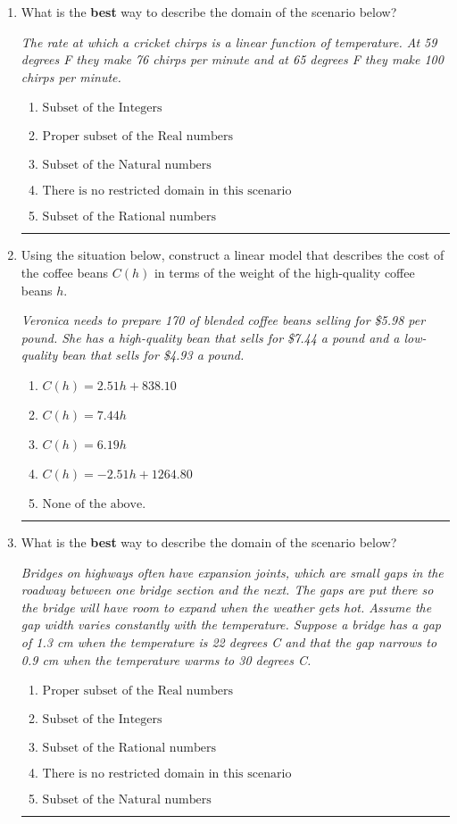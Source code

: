 \documentclass[14pt]{extbook}
\newcommand{\litem}[1]{\item#1\hspace*{-1cm}\rule{\textwidth}{0.4pt}}
\begin{document}
\begin{enumerate}
\litem{
What is the \textbf{best} way to describe the domain of the scenario below?
\begin{center}
    \textit{ The rate at which a cricket chirps is a linear function of temperature. At 59 degrees F they make 76 chirps per minute and at 65 degrees F they make 100 chirps per minute. }
\end{center}
\begin{enumerate}[label=\Alph*.]
\item \( \text{Subset of the Integers} \)
\item \( \text{Proper subset of the Real numbers} \)
\item \( \text{Subset of the Natural numbers} \)
\item \( \text{There is no restricted domain in this scenario} \)
\item \( \text{Subset of the Rational numbers} \)

\end{enumerate} }
\litem{
Using the situation below, construct a linear model that describes the cost of the coffee beans $C(h)$ in terms of the weight of the high-quality coffee beans $h$.
\begin{center}
    \textit{ Veronica needs to prepare 170 of blended coffee beans selling for \$5.98 per pound. She has a high-quality bean that sells for \$7.44 a pound and a low-quality bean that sells for \$4.93 a pound. }
\end{center}
\begin{enumerate}[label=\Alph*.]
\item \( C(h) = 2.51 h + 838.10 \)
\item \( C(h) = 7.44 h \)
\item \( C(h) = 6.19 h \)
\item \( C(h) = -2.51 h + 1264.80 \)
\item \( \text{None of the above.} \)

\end{enumerate} }
\litem{
What is the \textbf{best} way to describe the domain of the scenario below?
\begin{center}
    \textit{ Bridges on highways often have expansion joints, which are small gaps in the roadway between one bridge section and the next. The gaps are put there so the bridge will have room to expand when the weather gets hot. Assume the gap width varies constantly with the temperature. Suppose a bridge has a gap of 1.3 cm when the temperature is 22 degrees C and that the gap narrows to 0.9 cm when the temperature warms to 30 degrees C. }
\end{center}
\begin{enumerate}[label=\Alph*.]
\item \( \text{Proper subset of the Real numbers} \)
\item \( \text{Subset of the Integers} \)
\item \( \text{Subset of the Rational numbers} \)
\item \( \text{There is no restricted domain in this scenario} \)
\item \( \text{Subset of the Natural numbers} \)


\end{enumerate}}
\end{enumerate}
\end{document}
